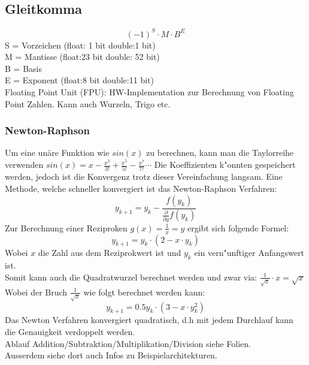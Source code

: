 \subsection{Gleitkomma}
\begin{equation}
(-1)^S\cdot M \cdot B^E
\end{equation}
S = Vorzeichen (float: 1 bit double:1 bit)\\
M = Mantisse (float:23 bit double: 52 bit)\\
B = Basis \\
E = Exponent (float:8 bit double:11 bit)\\

Floating Point Unit (FPU): HW-Implementation zur Berechnung von Floating Point Zahlen. Kann auch Wurzeln, Trigo etc.\\

\subsubsection{Newton-Raphson}
Um eine unäre Funktion wie $sin(x)$ zu berechnen, kann man die Taylorreihe verwenden $sin(x) = x - \frac{x^3}{3!} + \frac{x^5}{5!} - \frac{x^7}{7!}\cdots$ Die Koeffizienten k"onnten gespeichert werden, jedoch ist die Konvergenz trotz dieser Vereinfachung langsam. 
Eine Methode, welche schneller konvergiert ist das Newton-Raphson Verfahren: 
\begin{equation}
y_{k+1} = y_k - \frac{f(y_k)}{\frac{\partial}{\partial y}f(y_k)}
\end{equation}
Zur Berechnung einer Reziproken $g(x)=\frac{1}{x}=y$ ergibt sich folgende Formel: 
\begin{equation}
y_{k+1} = y_k\cdot (2-x\cdot y_k)
\end{equation}
Wobei $x$ die Zahl aus dem Reziprokwert ist und $y_k$ ein vern"unftiger Anfangswert ist. \\

Somit kann auch die Quadratwurzel berechnet werden und zwar via: $\frac{1}{\sqrt{x}} \cdot x = \sqrt{x}$\\
Wobei der Bruch $\frac{1}{\sqrt{x}}$ wie folgt berechnet werden kann:
\begin{equation}
y_{k+1} = 0.5y_k\cdot (3-x\cdot y_k^2)
\end{equation}
Das Newton Verfahren konvergiert quadratisch, d.h mit jedem Durchlauf kann die Genauigkeit verdoppelt werden.\\
Ablauf Addition/Subtraktion/Multiplikation/Division siehe Folien.\\
Ausserdem siehe dort auch Infos zu Beispielarchitekturen.

